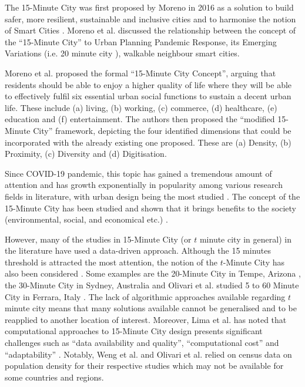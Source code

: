 The 15-Minute City was first proposed by Moreno in 2016 as a solution to build safer, more resilient, sustainable and inclusive cities and to harmonise the notion of Smart Cities \cite{moreno_introducing_2021}. Moreno et al. discussed the relationship between the concept of the “15-Minute City” to Urban Planning Pandemic Response, its Emerging Variations (i.e. 20 minute city \cite{capasso_da_silva_accessibility_2019}), walkable neighbour \cite{weng_15-minute_2019} smart cities. 

Moreno et al. proposed the formal “15-Minute City Concept”, arguing that residents should be able to enjoy a higher quality of life where they will be able to effectively fulfil six essential urban social functions to sustain a decent urban life. These include (a) living, (b) working, (c) commerce, (d) healthcare, (e) education and (f) entertainment. The authors then proposed the “modified 15-Minute City” framework, depicting the four identified dimensions that could be incorporated with the already existing one proposed. These are (a) Density, (b) Proximity, (c) Diversity and (d) Digitisation.

Since COVID-19 pandemic, this topic has gained a tremendous amount of attention and has growth exponentially in popularity \cite{lima_quest_2023,allam_theoretical_2022} among various research fields in literature, with urban design being the most studied \cite{lima_quest_2023}. The concept of the 15-Minute City has been studied and shown that it brings benefits to the society (environmental, social, and economical etc.) \cite{allam_theoretical_2022}.

However, many of the studies in 15-Minute City (or $t$ minute city in general) in the literature have used a data-driven approach. Although the 15 minutes threshold is attracted the most attention, the notion of the $t$-Minute City has also been considered \cite{moreno_introducing_2021}. Some examples are the 20-Minute City in Tempe, Arizona \cite{capasso_da_silva_accessibility_2019}, the 30-Minute City in Sydney, Australia \cite{sarkar_measuring_2020} and Olivari et al. studied 5 to 60 Minute City in Ferrara, Italy \cite{olivari_are_2023}. The lack of algorithmic approaches available regarding $t$ minute city means that many solutions available cannot be generalised and to be reapplied to another location of interest. Moreover, Lima et al. has noted that computational approaches to 15-Minute City design presents significant challenges such as “data availability and quality”, “computational cost” and “adaptability” \cite{lima_quest_2023}. Notably, Weng et al. \cite{weng_15-minute_2019} and Olivari et al.\cite{olivari_are_2023} relied on census data on population density for their respective studies which may not be available for some countries and regions. 